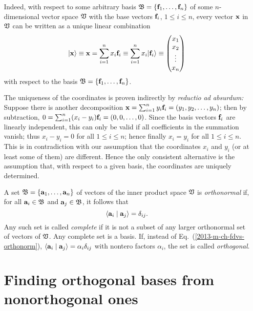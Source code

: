 Indeed, with respect to some arbitrary  basis ${\frak B}=\{
{\bf f}_1, \ldots , {\bf f}_n\}$ of some $n$-dimensional vector space ${\frak V}$
with the base vectors ${\bf f}_i$, $1\le i\le n$, every vector ${\bf x}$ in  ${\frak V}$
can be written as a unique linear combination
\begin{equation}
 \vert {\bf x} \rangle \equiv {\bf x} = \sum_{i=1}^n x_i{\bf f}_i
\equiv
\sum_{i=1}^n x_i \vert {\bf f}_i \rangle
\equiv \begin{pmatrix} x_1\\x_2\\ \vdots \\ x_n \end{pmatrix}
\end{equation}
with respect to the basis  ${\frak B}=\{
{\bf f}_1, \ldots , {\bf f}_n\}$.

{\color{OliveGreen}
\bproof
The uniqueness of the coordinates is proven indirectly by {\em reductio ad absurdum:}
Suppose there is another decomposition
${\bf x} = \sum_{i=1}^n y_i{\bf f}_i = (y_1,y_2, \ldots , y_n) $;
then by subtraction, $0 = \sum_{i=1}^n (x_i-y_i) {\bf f}_i = (0,0, \ldots , 0)$.
Since the basis vectors ${\bf f}_i$ are linearly independent,
this can only be valid if all coefficients in the summation  vanish;
thus $x_i-y_i=0$ for all $1\le i\le n$; hence finally  $x_i=y_i$ for all $1\le i\le n$.
This is in contradiction with our assumption that the coordinates $x_i$ and $y_i$
(or at least some of them) are different.
Hence the only consistent alternative is the assumption that, with respect to a given basis, the coordinates are uniquely determined.
\eproof
}

A  set    $\frak B = \{
{\bf a}_1, \ldots , {\bf a}_n\}$
of  vectors   of the inner product space $\frak V$
is {\em orthonormal}
if, for all
 ${\bf a}_i\in\frak B$ and
 ${\bf a}_j\in\frak B$,
it follows that
\begin{equation}
\langle {\bf a}_i \mid {\bf a}_j \rangle =\delta_{ij}.
\label{2013-m-ch-fdvs-orthonorm}
\end{equation}
Any such set is called {\em complete}
if it is not a subset of any larger orthonormal set of vectors of $\frak V$.
Any complete set is a basis.
If, instead of Eq.~(\ref{2013-m-ch-fdvs-orthonorm}),
$\langle {\bf a}_i \mid {\bf a}_j \rangle = \alpha_i \delta_{ij}$
with nontero factors $\alpha_i$, the set is called {\em orthogonal}.


\section{Finding orthogonal bases from nonorthogonal ones}

